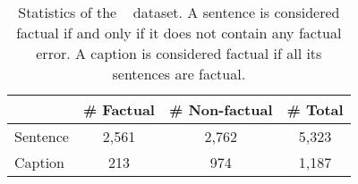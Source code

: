 \begin{table}[b]
    \small
    \centering
    \begin{adjustbox}{max width=0.47\textwidth}
    {
    \begin{tabular}{lccc}
        \toprule
        
        & \textbf{\# Factual} & \textbf{\# Non-factual} & \textbf{\# Total}\\
        \midrule
        Sentence & 2,561 & 2,762 & 5,323\\
        Caption & 213 & 974 & 1,187 \\

        \bottomrule
    \end{tabular}
    }
    \end{adjustbox}
    \caption{Statistics of the \chocolate~ dataset. A sentence is considered factual if and only if it does not contain any factual error. A caption is considered factual if all its sentences are factual.} 
    \label{tab:dataset_stats_chocolate}
    
\end{table}
